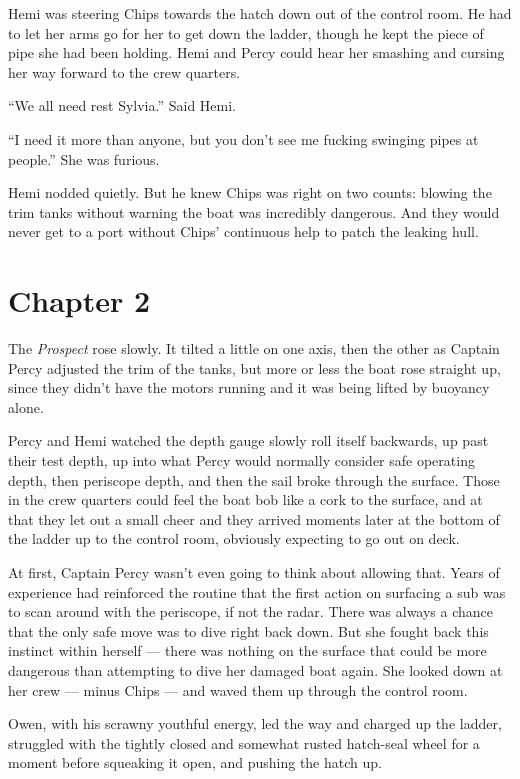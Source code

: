 \documentclass[
]{scrbook}
\begin{document}
Hemi was steering Chips towards the hatch down out of the control room.
He had to let her arms go for her to get down the ladder, though he kept
the piece of pipe she had been holding. Hemi and Percy could hear her
smashing and cursing her way forward to the crew quarters.

``We all need rest Sylvia.'' Said Hemi.

``I need it more than anyone, but you don't see me fucking swinging
pipes at people.'' She was furious.

Hemi nodded quietly. But he knew Chips was right on two counts: blowing
the trim tanks without warning the boat was incredibly dangerous. And
they would never get to a port without Chips' continuous help to patch
the leaking hull.

\hypertarget{chapter-2}{%
\chapter*{Chapter 2}\label{chapter-2}}

The \emph{Prospect} rose slowly. It tilted a little on one axis, then
the other as Captain Percy adjusted the trim of the tanks, but more or
less the boat rose straight up, since they didn't have the motors
running and it was being lifted by buoyancy alone.

Percy and Hemi watched the depth gauge slowly roll itself backwards, up
past their test depth, up into what Percy would normally consider safe
operating depth, then periscope depth, and then the sail broke through
the surface. Those in the crew quarters could feel the boat bob like a
cork to the surface, and at that they let out a small cheer and they
arrived moments later at the bottom of the ladder up to the control
room, obviously expecting to go out on deck.

At first, Captain Percy wasn't even going to think about allowing that.
Years of experience had reinforced the routine that the first action on
surfacing a sub was to scan around with the periscope, if not the radar.
There was always a chance that the only safe move was to dive right back
down. But she fought back this instinct within herself --- there was
nothing on the surface that could be more dangerous than attempting to
dive her damaged boat again. She looked down at her crew --- minus Chips
--- and waved them up through the control room.

Owen, with his scrawny youthful energy, led the way and charged up the
ladder, struggled with the tightly closed and somewhat rusted hatch-seal
wheel for a moment before squeaking it open, and pushing the hatch up.
\end{document}
